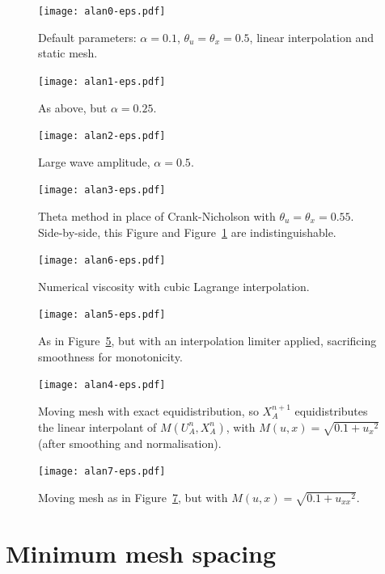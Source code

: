 \documentclass{article}
\begin{document}
\begin{figure}[htbp]
\centering
  \texttt{[image: alan0-eps.pdf]}
  \caption{Default parameters: $\alpha = 0.1$, $\theta_u = \theta_x = 0.5$,
  linear interpolation and static mesh.
  \label{fig:alan0-eps}}
\end{figure}
\begin{figure}[hbtp]
\centering
  \texttt{[image: alan1-eps.pdf]}
  \caption{As above, but $\alpha = 0.25$.
  \label{fig:alan1-eps}}
\end{figure}
\begin{figure}[htbp]
\centering
  \texttt{[image: alan2-eps.pdf]}
  \caption{Large wave amplitude, $\alpha = 0.5$.
  \label{fig:alan2-eps}}
\end{figure}
\begin{figure}[hbtp]
\centering
  \texttt{[image: alan3-eps.pdf]}
  \caption{Theta method in place of Crank-Nicholson with $\theta_u = \theta_x = 0.55$.
    Side-by-side, this Figure and Figure~\ref{fig:alan0-eps} are indistinguishable.
  \label{fig:alan3-eps}}
\end{figure}
\begin{figure}[htbp]
\centering
  \texttt{[image: alan6-eps.pdf]}
  \caption{Numerical viscosity with cubic Lagrange interpolation.
  \label{fig:alan6-eps}}
\end{figure}
\begin{figure}[hbtp]
\centering
  \texttt{[image: alan5-eps.pdf]}
  \caption{As in Figure~\ref{fig:alan6-eps}, but with an interpolation limiter
  applied, sacrificing smoothness for monotonicity.
  \label{fig:alan5-eps}}
\end{figure}
\begin{figure}[htbp]
\centering
  \texttt{[image: alan4-eps.pdf]}
  \caption{Moving mesh with exact equidistribution, so $X_A^{n+1}$
    equidistributes the linear interpolant of $M(U^n_A,X^n_A)$, with
    $M(u,x) = \sqrt{0.1 + {u_x}^2}$ (after smoothing and normalisation).
  \label{fig:alan4-eps}}
\end{figure}
\begin{figure}[hbtp]
\centering
  \texttt{[image: alan7-eps.pdf]}
  \caption{Moving mesh as in Figure~\ref{fig:alan4-eps}, but with
  $M(u,x) = \sqrt{0.1 + {u_{xx}}^2}$.
  \label{fig:alan7-eps}}
\end{figure}

\clearpage
\section{Minimum mesh spacing}
\end{document}
